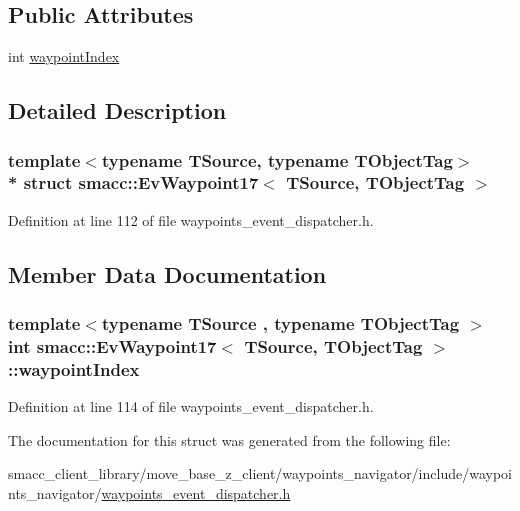 \subsection*{Public Attributes}
\begin{DoxyCompactItemize}
\item 
int \hyperlink{structsmacc_1_1EvWaypoint17_afde1924602361d619953cfba2fd1fbac}{waypoint\+Index}
\end{DoxyCompactItemize}


\subsection{Detailed Description}
\subsubsection*{template$<$typename T\+Source, typename T\+Object\+Tag$>$\\*
struct smacc\+::\+Ev\+Waypoint17$<$ T\+Source, T\+Object\+Tag $>$}



Definition at line 112 of file waypoints\+\_\+event\+\_\+dispatcher.\+h.



\subsection{Member Data Documentation}
\subsubsection[{\texorpdfstring{waypoint\+Index}{waypointIndex}}]{\setlength{\rightskip}{0pt plus 5cm}template$<$typename T\+Source , typename T\+Object\+Tag $>$ int {\bf smacc\+::\+Ev\+Waypoint17}$<$ T\+Source, T\+Object\+Tag $>$\+::waypoint\+Index}\hypertarget{structsmacc_1_1EvWaypoint17_afde1924602361d619953cfba2fd1fbac}{}\label{structsmacc_1_1EvWaypoint17_afde1924602361d619953cfba2fd1fbac}


Definition at line 114 of file waypoints\+\_\+event\+\_\+dispatcher.\+h.



The documentation for this struct was generated from the following file\+:\begin{DoxyCompactItemize}
\item 
smacc\+\_\+client\+\_\+library/move\+\_\+base\+\_\+z\+\_\+client/waypoints\+\_\+navigator/include/waypoints\+\_\+navigator/\hyperlink{waypoints__event__dispatcher_8h}{waypoints\+\_\+event\+\_\+dispatcher.\+h}\end{DoxyCompactItemize}
